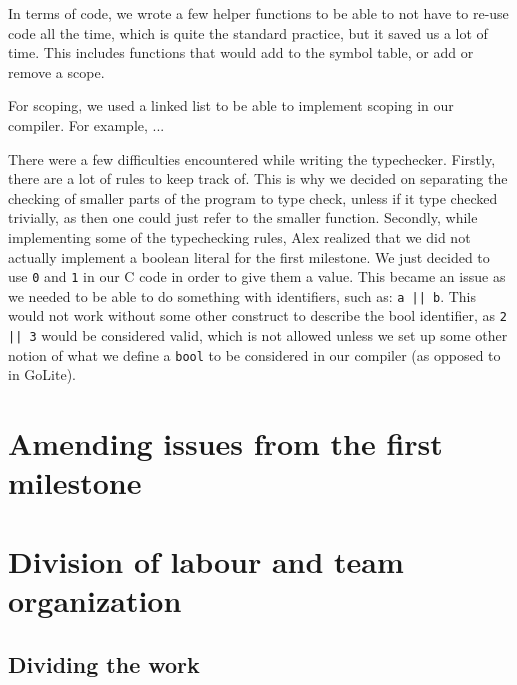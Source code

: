 \documentclass{article}
\begin{document}
In terms of code, we wrote a few helper functions to be able to not have to
re-use code all the time, which is quite the standard practice, but it saved
us a lot of time. This includes functions that would add to the symbol table, or
add or remove a scope.

For scoping, we used a linked list to be able to implement scoping in our compiler.
For example, ... %


There were a few difficulties encountered while writing the typechecker. Firstly,
there are a lot of rules to keep track of. This is why we decided on separating
the checking of smaller parts of the program to type check, unless if it type
checked trivially, as then one could just refer to the smaller function.
Secondly, while implementing some of the typechecking rules, Alex realized that
we did not actually implement a boolean literal for the first milestone. We
just decided to use \verb$0$ and \verb$1$ in our C code in order to give them
a value. This became an issue as we needed to be able to do something with
identifiers, such as: \verb$a || b$. This would not work without some other
construct to describe the bool identifier, as \verb$2 || 3$ would be considered
valid, which is not allowed unless we set up some other notion of what we
define a \verb$bool$ to be considered in our compiler (as opposed to in GoLite).


\section{Amending issues from the first milestone}



\section{Division of labour and team organization}

\subsection{Dividing the work}
\end{document}
